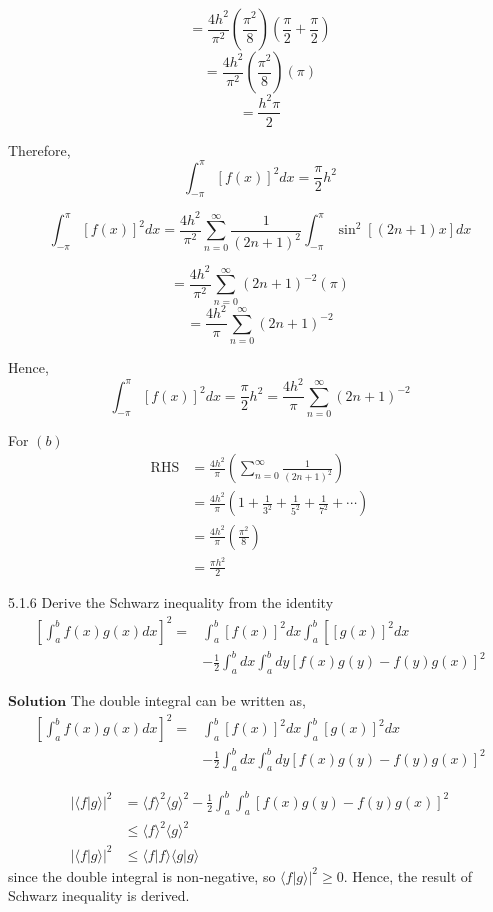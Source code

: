 \documentclass{article}
\begin{document}
\begin{flushleft}
$$=\frac{4 h^{2}}{\pi^{2}}\left(\frac{\pi^{2}}{8}\right)\left(\frac{\pi}{2}+\frac{\pi}{2}\right)$$
$$=\frac{4 h^{2}}{\pi^{2}}\left(\frac{\pi^{2}}{8}\right)(\pi)$$
$$=\frac{h^{2} \pi}{2}$$


Therefore, $$\int_{-\pi}^{\pi}[f(x)]^{2} d x=\frac{\pi}{2} h^{2}$$

$$
\int_{-\pi}^{\pi}[f(x)]^{2} d x=\frac{4 h^{2}}{\pi^{2}} \sum_{n=0}^{\infty} \frac{1}{(2 n+1)^{2}} \int_{-\pi}^{\pi} \sin ^{2}[(2 n+1) x] d x
$$

$$=\frac{4 h^{2}}{\pi^{2}} \sum_{n=0}^{\infty}(2 n+1)^{-2}(\pi)$$
$$=\frac{4 h^{2}}{\pi} \sum_{n=0}^{\infty}(2 n+1)^{-2}$$

Hence, $$\int_{-\pi}^{\pi}[f(x)]^{2} d x=\frac{\pi}{2} h^{2}=\frac{4 h^{2}}{\pi} \sum_{n=0}^{\infty}(2 n+1)^{-2}$$


For $(b)$ $$
\begin{aligned}
\mathrm{RHS} &=\frac{4 h^{2}}{\pi}\left(\sum_{n=0}^{\infty} \frac{1}{(2 n+1)^{2}}\right) \\
&=\frac{4 h^{2}}{\pi}\left(1+\frac{1}{3^{2}}+\frac{1}{5^{2}}+\frac{1}{7^{2}}+\cdots\right) \\
&=\frac{4 h^{2}}{\pi}\left(\frac{\pi^{2}}{8}\right) \\
&=\frac{\pi h^{2}}{2}
\end{aligned}
$$

\newpage


\begin{mybox}{5.1.6}
Derive the Schwarz inequality from the identity
$$
\begin{aligned}
\left[\int_{a}^{b} f(x) g(x) d x\right]^{2}=& \int_{a}^{b}[f(x)]^{2} d x \int_{a}^{b}\left[[g(x)]^{2} d x\right.\\
&-\frac{1}{2} \int_{a}^{b} d x \int_{a}^{b} d y[f(x) g(y)-f(y) g(x)]^{2}
\end{aligned}
$$
\end{mybox}

$\boxed{\textbf{Solution}}$ The double integral can be written as,
$$
\begin{aligned}
\left[\int_{a}^{b} f(x) g(x) d x\right]^{2}=& \int_{a}^{b}[f(x)]^{2} d x \int_{a}^{b}[g(x)]^{2} d x \\
&-\frac{1}{2} \int_{a}^{b} d x \int_{a}^{b} d y[f(x) g(y)-f(y) g(x)]^{2}
\end{aligned}
$$

$$
\begin{aligned}
|\langle f | g\rangle|^{2} &=\langle f\rangle^{2}\langle g\rangle^{2}-\frac{1}{2} \int_{a}^{b} \int_{a}^{b}[f(x) g(y)-f(y) g(x)]^{2} \\
& \leq\langle f\rangle^{2}\langle g\rangle^{2} \\
|\langle f | g\rangle|^{2} & \leq\langle f | f\rangle\langle g | g\rangle
\end{aligned}
$$
since the double integral is non-negative, so $\left.\langle f | g\rangle\right|^{2} \geq 0$.
Hence, the result of Schwarz inequality is derived.


\end{flushleft}
\end{document}

